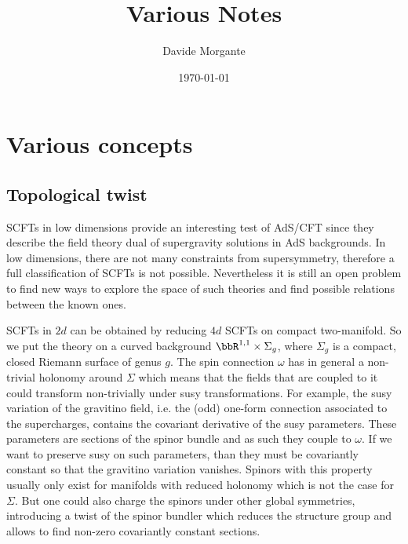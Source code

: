 \documentclass[11pt]{book}
\title{\vspace{1cm}\bf{Various Notes}\vspace{0.2cm}}
\date{\vspace{0.2cm} \today}
\author{Davide Morgante}
\theoremstyle{definition}
\numberwithin{equation}{section}
\begin{document}
\allowdisplaybreaks
\maketitle

\setcounter{page}{1}
{\hypersetup{linkcolor=orange}
\tableofcontents
}
\mainmatter





%





\chapter{Various concepts}
\section{Topological twist}
SCFTs in low dimensions provide an interesting test of AdS/CFT since they describe the field theory dual of supergravity solutions in AdS backgrounds. In low dimensions, there are not many constraints from supersymmetry, therefore a full classification of SCFTs is not possible. Nevertheless it is still an open problem to find new ways to explore the space of such theories and find possible relations between the known ones.

SCFTs in $2d$ can be obtained by reducing $4d$ SCFTs on compact two-manifold. So we put the theory on a curved background $\bbR^{1,1}\times\Sigma_g$, where $\Sigma_g$ is a compact, closed Riemann surface of genus $g$. The spin connection $\omega$ has in general a non-trivial holonomy around $\Sigma$ which means that the fields that are coupled to it could transform non-trivially under susy transformations. For example, the susy variation of the gravitino field, i.e. the (odd) one-form connection associated to the supercharges, contains the covariant derivative of the susy parameters. These parameters are sections of the spinor bundle and as such they couple to $\omega$. If we want to preserve susy on such parameters, than they must be covariantly constant so that the gravitino variation vanishes. Spinors with this property usually only exist for manifolds with reduced holonomy which is not the case for $\Sigma$. But one could also charge the spinors under other global symmetries, introducing a twist of the spinor bundler which reduces the structure group and allows to find non-zero covariantly constant sections. 
\end{document}
